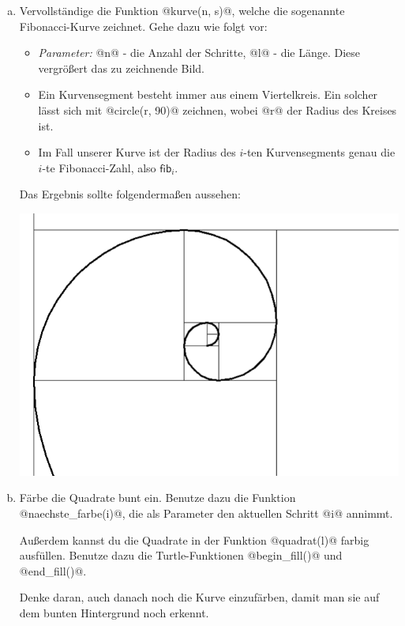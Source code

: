 \begin{enumerate}[(a)]
        \item
        Vervollständige die Funktion @kurve(n, s)@, welche die sogenannte Fibonacci-Kurve zeichnet. Gehe dazu wie folgt vor:
        \begin{itemize}
            \item 
            \textit{Parameter:} @n@ - die Anzahl der Schritte, @l@ - die Länge. Diese vergrößert das zu zeichnende Bild.
            \item
            Ein Kurvensegment besteht immer aus einem Viertelkreis. Ein solcher lässt sich mit @circle(r, 90)@ zeichnen, wobei @r@ der Radius des Kreises ist.
            \item
            Im Fall unserer Kurve ist der Radius des $i$-ten Kurvensegments genau die $i$-te Fibonacci-Zahl, also $\mathsf{fib}_i$.
        \end{itemize}

        Das Ergebnis sollte folgendermaßen aussehen:
        \begin{center}  
            \includegraphics[scale=0.35]{img/fib_curve}
        \end{center}

        \item
        Färbe die Quadrate bunt ein. Benutze dazu die Funktion @naechste_farbe(i)@, die als Parameter den aktuellen Schritt @i@ annimmt. 
        
        Außerdem kannst du die Quadrate in der Funktion @quadrat(l)@ farbig ausfüllen. Benutze dazu die Turtle-Funktionen @begin_fill()@ und @end_fill()@.
        
        Denke daran, auch danach noch die Kurve einzufärben, damit man sie auf dem bunten Hintergrund noch erkennt.
    

\end{enumerate}
